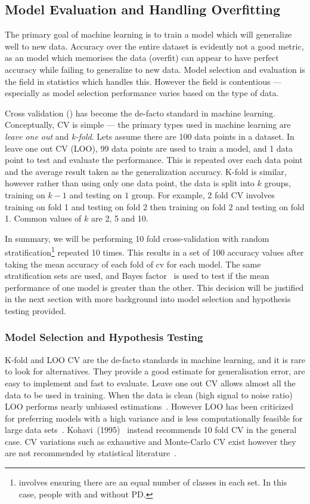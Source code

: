 \documentclass[12pt, twoside]{book}
\renewcommand\emph[1]{\textit{\color{USred}{#1}}}
\begin{document}
\subsection{Model Evaluation and Handling Overfitting}
\label{detectoverfit}
The primary goal of machine learning is to train a model which will generalize well to new data. Accuracy over the entire dataset is evidently not a good metric, as an model which memorises the data (overfit) can appear to have perfect accuracy while failing to generalize to new data. Model selection and evaluation is the field in statistics which handles this. However the field is contentious --- especially as model selection performance varies based on the type of data. 

Cross validation (\emph{CV}) has become the de-facto standard in machine learning. Conceptually, CV is simple --- the primary types used in machine learning are \textit{leave one out} and \textit{k-fold}. Lets assume there are 100 data points in a dataset. In leave one out CV (LOO), 99 data points are used to train a model, and 1 data point to test and evaluate the performance. This is repeated over each  data point and the average result taken as the generalization accuracy. K-fold is similar, however rather than using only one data point, the data is split into $k$ groups, training on $k-1$ and testing on $1$ group. For example, 2 fold CV involves training on fold 1 and testing on fold 2 then training on fold 2 and testing on fold 1. Common values of $k$ are 2, 5 and 10.   

In summary, we will be performing 10 fold cross-validation with random stratification\footnote{\emph{Stratification} involves ensuring there are an equal number of classes in each set. In this case, people with and without PD. } repeated 10 times. This results in a set of 100 accuracy values after taking the mean accuracy of each fold of cv for each model. The same stratification sets are used, and Bayes factor~\cite{bayesianttests} is used to test if the mean performance of one model is greater than the other. This decision will be justified in the next section with more background into model selection and hypothesis testing provided.

\subsubsection{Model Selection and Hypothesis Testing}
\label{msht}
K-fold and LOO CV are the de-facto standards in machine learning, and it is rare to look for alternatives. They provide a good estimate for generalisation error, are easy to implement and fast to evaluate. Leave one out CV allows almost all the data to be used in training. When the data is clean (high signal to noise ratio) LOO performs nearly unbiased estimations~\cite{crossvalsurvey}. However LOO has been criticized for preferring models with a high variance and is less computationally feasible for large data sets~\cite{kohavi1995study}. Kohavi~(1995)~\cite{kohavi1995study} instead recommends 10 fold CV in the general case. CV variations such as exhaustive and Monte-Carlo CV exist however they are not recommended by statistical literature~\cite{kfoldvsloo, crossvalsurvey}. 
\end{document}
